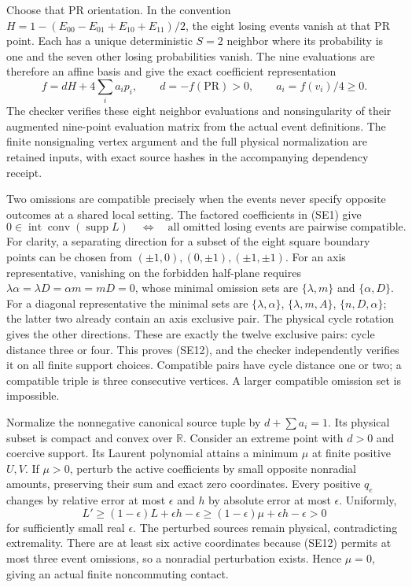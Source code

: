 Choose that PR orientation.  In the convention
$H=1-(E_{00}-E_{01}+E_{10}+E_{11})/2$, the eight losing events
vanish at that PR point.  Each has a unique deterministic $S=2$
neighbor where its probability is one and the seven other losing
probabilities vanish.  The nine evaluations are therefore an affine
basis and give the exact coefficient representation
\[
f=dH+4\sum_i a_i p_i,\qquad
d=-f(\mathrm{PR})>0,\qquad a_i=f(v_i)/4\geq0.
\tag{SE11}
\]
The checker verifies these eight neighbor evaluations and nonsingularity
of their augmented nine-point evaluation matrix from the actual event
definitions.  The finite nonsignaling vertex argument and the full
physical normalization are retained inputs, with exact source hashes
in the accompanying dependency receipt.

Two omissions are compatible precisely when the events never specify
opposite outcomes at a shared local setting.  The factored coefficients
in (SE1) give
\[
0\in\operatorname{int}\operatorname{conv}(\operatorname{supp}L)
\quad\Longleftrightarrow\quad
\text{all omitted losing events are pairwise compatible}.
\tag{SE12}
\]
For clarity, a separating direction for a subset of the eight square
boundary points can be chosen from
$(\pm1,0),(0,\pm1),(\pm1,\pm1)$.  For an axis representative,
vanishing on the forbidden half-plane requires
$\lambda\alpha=\lambda D=\alpha m=mD=0$, whose minimal
omission sets are $\{\lambda,m\}$ and $\{\alpha,D\}$.
For a diagonal representative the minimal sets are
$\{\lambda,\alpha\}$, $\{\lambda,m,A\}$,
$\{n,D,\alpha\}$; the latter two already contain an axis
exclusive pair.  The physical cycle rotation gives the other directions.
These are exactly the twelve exclusive pairs: cycle distance three or
four.  This proves (SE12), and the checker independently verifies it on
all finite support choices.  Compatible pairs have cycle distance one
or two; a compatible triple is three consecutive vertices.  A larger
compatible omission set is impossible.

Normalize the nonnegative canonical source tuple by
$d+\sum a_i=1$.  Its physical subset is compact and convex over
$\mathbb R$.  Consider an extreme point with $d>0$ and coercive
support.  Its Laurent polynomial attains a minimum $\mu$ at finite
positive $U,V$.  If $\mu>0$, perturb the active coefficients by
small opposite nonradial amounts, preserving their sum and exact zero
coordinates.  Every positive $q_e$ changes by relative error at most
$\epsilon$ and $h$ by absolute error at most $\epsilon$.  Uniformly,
\[
L'\geq(1-\epsilon)L+\epsilon h-\epsilon
 \geq(1-\epsilon)\mu+\epsilon h-\epsilon>0
\tag{SE13}
\]
for sufficiently small real $\epsilon$.  The perturbed sources remain
physical, contradicting extremality.  There are at least six active
coordinates because (SE12) permits at most three event omissions, so
a nonradial perturbation exists.  Hence $\mu=0$, giving an actual
finite noncommuting contact.


